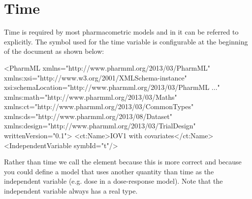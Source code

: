 

\section{Time}
\label{sec:independent-var}

Time is required by most pharmacometric models and in \pharmml it can
be referred to explicitly. The symbol used for the time variable is
configurable at the beginning of the document as shown below:
%
\begin{xmlcode}
<PharmML xmlns="http://www.pharmml.org/2013/03/PharmML"
    xmlns:xsi="http://www.w3.org/2001/XMLSchema-instance"
    xsi:schemaLocation="http://www.pharmml.org/2013/03/PharmML ..."
    xmlns:math="http://www.pharmml.org/2013/03/Maths"
    xmlns:ct="http://www.pharmml.org/2013/03/CommonTypes"
    xmlns:ds="http://www.pharmml.org/2013/08/Dataset"
    xmlns:design="http://www.pharmml.org/2013/03/TrialDesign"
    writtenVersion="0.1">
    <ct:Name>IOV1 with covariates</ct:Name>
    <IndependentVariable symbId="t"/>
\end{xmlcode}
%
Rather than time we call the element 
because this is more correct and because you could define a model that
uses another quantity than time as the independent variable (e.g.\xspace
dose in a dose-response model). Note that the independent variable
always has a real type.


